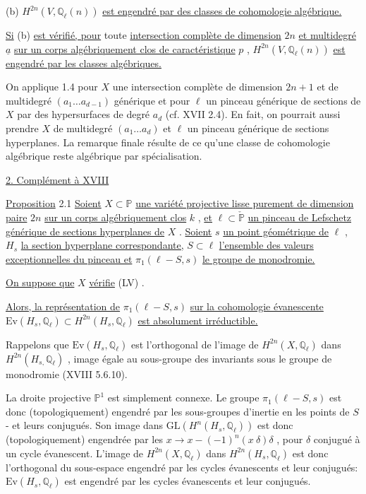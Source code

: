 (b) $H^{2n}(V, \mathbb{Q}_\ell(n))$ \underline{est engendré par des classes de cohomologie algébrique.}

\underline{Si} (b) \underline{est vérifié, pour} toute \underline{intersection complète de dimension} $2n$ \underline{et multidegré} $\underline{a}$ \underline{sur un corps algébriquement clos de caractéristique} $p$ , $H^{2n}(V, \mathbb{Q}_\ell(n))$ \underline{est engendré par les classes algébriques.}

On applique 1.4 pour $X$ une intersection complète de dimension $2n+1$ et de multidegré $(a_1 \ldots a_{d-1})$ générique et pour $\ell$ un pinceau générique de sections de $X$ par des hypersurfaces de degré $a_d$ (cf. XVII 2.4). En fait, on pourrait aussi prendre $X$ de multidegré $(a_1 \ldots a_d)$ et $\ell$ un pinceau générique de sections hyperplanes. La remarque finale résulte de ce qu'une classe de cohomologie algébrique reste algébrique par spécialisation.


\underline{2. Complément à XVIII}

\underline{Proposition} 2.1 \quad \underline{Soient} $X \subset \mathbb{P}$ \underline{une variété projective lisse purement de dimension paire} $2n$ \underline{sur un corps algébriquement clos} $k$ , \underline{et} $\ell \subset \check{\mathbb{P}}$ \underline{un pinceau de Lefschetz générique de sections hyperplanes de} $X$ . \underline{Soient} $s$ \underline{un point géométrique de} $\ell$ , $H_s$ \underline{la section hyperplane correspondante,} $S \subset \ell$ \underline{l'ensemble des valeurs exceptionnelles du pinceau et} $\pi_1(\ell - S, s)$ \underline{le groupe de monodromie.}

\underline{On suppose que} $X$ \underline{vérifie} (LV) .

\underline{Alors, la représentation de} $\pi_1(\ell - S, s)$ \underline{sur la cohomologie évanescente} $\mathrm{Ev}(H_s, \mathbb{Q}_\ell) \subset H^{2n}(H_s, \mathbb{Q}_\ell)$ \underline{est absolument irréductible.}

Rappelons que $\mathrm{Ev}(H_s, \mathbb{Q}_\ell)$ est l'orthogonal de l'image de $H^{2n}(X, \mathbb{Q}_\ell)$ dans $H^{2n}(H_{s,} \mathbb{Q}_\ell)$ , image égale au sous-groupe des invariants sous le groupe de monodromie (XVIII 5.6.10).



La droite projective $\mathbb{P}^1$ est simplement connexe. Le groupe $\pi_1(\ell - S, s)$ est donc (topologiquement) engendré par les sous-groupes d'inertie en les points de $S$ - et leurs conjugués. Son image dans $\mathrm{GL}(H^n(H_s, \mathbb{Q}_\ell))$ est donc (topologiquement) engendrée par les $x \longrightarrow x - (-1)^n(x\ \delta)\delta$ , pour $\delta$ conjugué à un cycle évanescent. L'image de $H^{2n}(X, \mathbb{Q}_\ell)$ dans $H^{2n}(H_s, \mathbb{Q}_\ell)$ est donc l'orthogonal du sous-espace engendré par les cycles évanescents et leur conjugués: $\mathrm{Ev}(H_s, \mathbb{Q}_\ell)$ est engendré par les cycles évanescents et leur conjugués.

